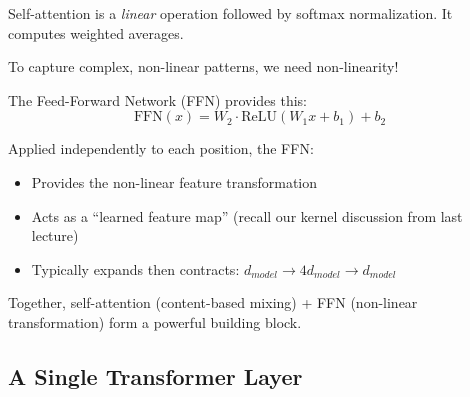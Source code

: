 \documentclass{article}
\begin{document}
\begin{tcolorbox}[colback=yellow!5!white, colframe=orange!50!black, title=Attention Alone is Not Enough]
Self-attention is a \textit{linear} operation followed by softmax normalization. It computes weighted averages.

To capture complex, non-linear patterns, we need non-linearity!

The Feed-Forward Network (FFN) provides this:
\[
\text{FFN}(x) = W_2 \cdot \text{ReLU}(W_1 x + b_1) + b_2
\]

Applied independently to each position, the FFN:
\begin{itemize}
\item Provides the non-linear feature transformation
\item Acts as a ``learned feature map'' (recall our kernel discussion from last lecture)
\item Typically expands then contracts: $d_{model} \rightarrow 4 d_{model} \rightarrow d_{model}$
\end{itemize}

Together, self-attention (content-based mixing) + FFN (non-linear transformation) form a powerful building block.
\end{tcolorbox}



\subsection{A Single Transformer Layer}
\end{document}
